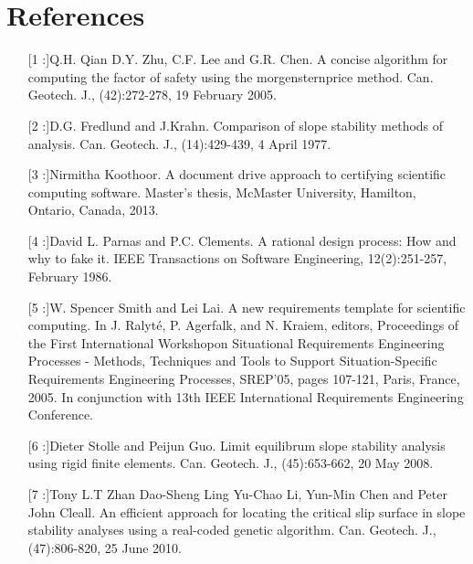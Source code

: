 \documentclass[12pt]{article}
\begin{document}
\section{References}
\label{Sec:R}
\begin{itemize}
\item[[1]:]Q.H. Qian D.Y. Zhu, C.F. Lee and G.R. Chen. A concise algorithm for computing the factor of safety using the morgensternprice method. Can. Geotech. J., (42):272-278, 19 February 2005.
\item[[2]:]D.G. Fredlund and J.Krahn. Comparison of slope stability methods of analysis. Can. Geotech. J., (14):429-439, 4 April 1977.
\item[[3]:]Nirmitha Koothoor. A document drive approach to certifying scientific computing software. Master's thesis, McMaster University, Hamilton, Ontario, Canada, 2013.
\item[[4]:]David L. Parnas and P.C. Clements. A rational design process: How and why to fake it. IEEE Transactions on Software Engineering, 12(2):251-257, February 1986.
\item[[5]:]W. Spencer Smith and Lei Lai. A new requirements template for scientific computing. In J. Ralyt\'{e}, P. Agerfalk, and N. Kraiem, editors, Proceedings of the First International Workshopon Situational Requirements Engineering Processes - Methods, Techniques and Tools to Support Situation-Specific Requirements Engineering Processes, SREP'05, pages 107-121, Paris, France, 2005. In conjunction with 13th IEEE International Requirements Engineering Conference.
\item[[6]:]Dieter Stolle and Peijun Guo. Limit equilibrum slope stability analysis using rigid finite elements. Can. Geotech. J., (45):653-662, 20 May 2008.
\item[[7]:]Tony L.T Zhan Dao-Sheng Ling Yu-Chao Li, Yun-Min Chen and Peter John Cleall. An efficient approach for locating the critical slip surface in slope stability analyses using a real-coded genetic algorithm. Can. Geotech. J., (47):806-820, 25 June 2010.
\end{itemize}
\end{document}
